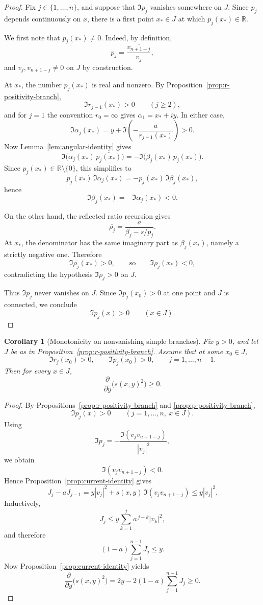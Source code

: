 \documentclass[11pt]{article}
\newtheorem{corollary}[theorem]{Corollary}
\begin{document}
\begin{proof}
Fix \(j\in\{1,\dots,n\}\), and suppose that \(\Im p_j\) vanishes somewhere on \(J\). Since \(p_j\) depends continuously on \(x\), there is a first point \(x_*\in J\) at which \(p_j(x_*)\in\mathbb R\).

We first note that \(p_j(x_*)\neq 0\). Indeed, by definition,
\[
p_j=\frac{\overline{v_{n+1-j}}}{v_j},
\]
and \(v_j,v_{n+1-j}\neq 0\) on \(J\) by construction.

At \(x_*\), the number \(p_j(x_*)\) is real and nonzero. By Proposition~\ref{prop:r-positivity-branch},
\[
\Im r_{j-1}(x_*)>0
\qquad
(j\ge 2),
\]
and for \(j=1\) the convention \(r_0=\infty\) gives \(\alpha_1=x_*+iy\). In either case,
\[
\Im \alpha_j(x_*)
=
y+\Im\!\left(-\frac{a}{r_{j-1}(x_*)}\right)
>0.
\]
Now Lemma~\ref{lem:angular-identity} gives
\[
\Im\!\bigl(\alpha_j(x_*)\,\overline{p_j(x_*)}\bigr)
=
-\Im\!\bigl(\beta_j(x_*)\,p_j(x_*)\bigr).
\]
Since \(p_j(x_*)\in\mathbb R\setminus\{0\}\), this simplifies to
\[
p_j(x_*)\,\Im \alpha_j(x_*)
=
-p_j(x_*)\,\Im \beta_j(x_*),
\]
hence
\[
\Im \beta_j(x_*)=-\Im \alpha_j(x_*)<0.
\]

On the other hand, the reflected ratio recursion gives
\[
\overline{\rho_j}
=
\frac{a}{\beta_j-s/p_j}.
\]
At \(x_*\), the denominator has the same imaginary part as \(\beta_j(x_*)\), namely a strictly negative one. Therefore
\[
\Im \overline{\rho_j}(x_*)>0,
\qquad\text{so}\qquad
\Im \rho_j(x_*)<0,
\]
contradicting the hypothesis \(\Im \rho_j>0\) on \(J\).

Thus \(\Im p_j\) never vanishes on \(J\). Since \(\Im p_j(x_0)>0\) at one point and \(J\) is connected, we conclude
\[
\Im p_j(x)>0
\qquad
(x\in J).
\]
\end{proof}

\begin{corollary}[Monotonicity on nonvanishing simple branches]\label{cor:monotonicity-on-branch}
Fix \(y>0\), and let \(J\) be as in Proposition~\ref{prop:r-positivity-branch}. Assume that at some \(x_0\in J\),
\[
\Im r_j(x_0)>0,
\qquad
\Im p_j(x_0)>0,
\qquad
j=1,\dots,n-1.
\]
Then for every \(x\in J\),
\[
\frac{\partial}{\partial y}\bigl(s(x,y)^2\bigr)\ge 0.
\]
\end{corollary}

\begin{proof}
By Propositions~\ref{prop:r-positivity-branch} and \ref{prop:p-positivity-branch},
\[
\Im p_j(x)>0
\qquad
(j=1,\dots,n,\ x\in J).
\]
Using
\[
\Im p_j
=
-\frac{\Im(v_jv_{n+1-j})}{|v_j|^2},
\]
we obtain
\[
\Im(v_jv_{n+1-j})<0.
\]
Hence Proposition~\ref{prop:current-identity} gives
\[
J_j-aJ_{j-1}
=
y|v_j|^2+s(x,y)\,\Im(v_jv_{n+1-j})
\le y|v_j|^2.
\]
Inductively,
\[
J_j\le y\sum_{k=1}^j a^{\,j-k}|v_k|^2,
\]
and therefore
\[
(1-a)\sum_{j=1}^{n-1}J_j\le y.
\]
Now Proposition~\ref{prop:current-identity} yields
\[
\frac{\partial}{\partial y}\bigl(s(x,y)^2\bigr)
=
2y-2(1-a)\sum_{j=1}^{n-1}J_j
\ge 0.
\]
\end{proof}
\end{document}
